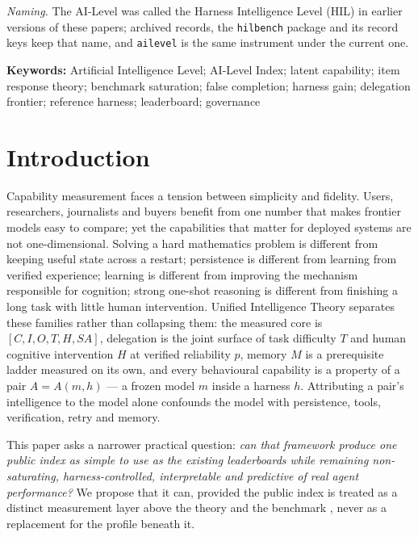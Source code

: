 \noindent\emph{Naming.} The AI-Level was called the Harness Intelligence Level (HIL) in earlier versions of these papers; archived records, the \texttt{hilbench} package and its record keys keep that name, and \texttt{ailevel} is the same instrument under the current one.

\noindent\textbf{Keywords:} Artificial Intelligence Level; AI-Level Index; latent capability; item response theory; benchmark saturation; false completion; harness gain; delegation frontier; reference harness; leaderboard; governance

\tableofcontents
\bigskip

\section{Introduction}\label{sec:intro}

Capability measurement faces a tension between simplicity and fidelity. Users, researchers, journalists and buyers benefit from one number that makes frontier models easy to compare; yet the capabilities that matter for deployed systems are not one-dimensional. Solving a hard mathematics problem is different from keeping useful state across a restart; persistence is different from learning from verified experience; learning is different from improving the mechanism responsible for cognition; strong one-shot reasoning is different from finishing a long task with little human intervention. Unified Intelligence Theory \citep{yang2026unified} separates these families rather than collapsing them: the measured core is $[C, I, O, T, H, SA]$, delegation is the joint surface of task difficulty $T$ and human cognitive intervention $H$ at verified reliability $p$, memory $M$ is a prerequisite ladder measured on its own, and every behavioural capability is a property of a pair $A = A(m, h)$ --- a frozen model $m$ inside a harness $h$. Attributing a pair's intelligence to the model alone confounds the model with persistence, tools, verification, retry and memory.

This paper asks a narrower practical question: \emph{can that framework produce one public index as simple to use as the existing leaderboards while remaining non-saturating, harness-controlled, interpretable and predictive of real agent performance?} We propose that it can, provided the public index is treated as a distinct measurement layer above the theory and the benchmark \citep{yang2026hilbenchpaper}, never as a replacement for the profile beneath it.

